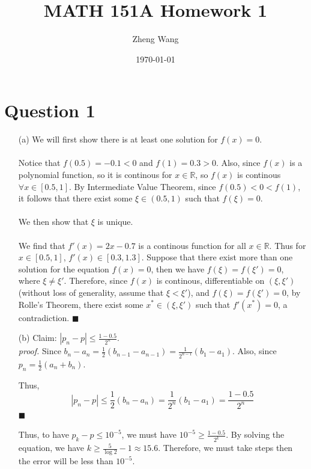 \documentclass[11pt]{article}
\author{Zheng Wang}
\date{\today}
\title{MATH 151A Homework 1}
\newcommand*{\boxtex}[1]{\framebox{#1}}
\begin{document}
\maketitle

\section*{Question 1}
\begin{itemize}
	\item[(a)]
	We will first show there is at least one solution for $ f(x)=0 $. \\\\
	 Notice that $ f(0.5) = -0.1 < 0 $ and $ f(1) = 0.3 > 0 $. Also, since $ f(x) $ is a polynomial function, so it is continous for $ x \in \mathbb{R} $, so $ f(x) $ is continous $ \forall x \in [0.5,1] $. By Intermediate Value Theorem, since $ f(0.5) < 0 < f(1) $, it follows that there exist some $ \xi \in  (0.5,1) $ such that $ f(\xi) = 0 $.\\\\
	We then show that $ \xi $ is unique.\\\\
	We find that $ f'(x) = 2x-0.7 $ is a continous function for all $ x \in \mathbb{R} $. Thus for $ x \in [0.5,1] $, $ f'(x) \in [0.3,1.3] $. Suppose that there exist more than one solution for the equation $ f(x)=0 $, then we have $ f(\xi)=f(\xi')=0 $, where $ \xi \ne \xi' $. Therefore, since $ f(x) $ is continous, differentiable on $ (\xi,\xi') $ (without loss of generality, assume that $ \xi < \xi' $), and $ f(\xi) = f(\xi')=0 $, by Rolle's Theorem, there exist some $ x^* \in (\xi, \xi') $ such that $ f'(x^*) = 0 $, a contradiction. \hfill$ \blacksquare $ 
	
	\item[(b)]
	Claim: $ \left| p_n- p \right| \le \frac{1-0.5}{2^n}  $.\\
	\textit{proof.} Since $ b_n - a_n = \frac{1}{2}(b_{n-1} - a_{n-1}) = \frac{1}{2^{n-1}}(b_1 - a_1) $. Also, since $ p_n = \frac{1}{2} (a_n+b_n) $.
	
	Thus, \[ \left| p_n - p \right| \le \frac{1}{2}\left(b_n-a_n \right) = \frac{1}{2^n}(b_1-a_1) = \frac{1-0.5}{2^n} \]
	\hfill$ \blacksquare $
	
	Thus, to have $ p_k - p \le 10^{-5} $, we must have $ 10^{-5} \ge \frac{1-0.5}{2^k} $. By solving the equation, we have $ k \ge \frac{5}{\log{2}} -1 \approx 15.6 $. Therefore, we must take \boxtex{$ k = 16 $} steps then the error will be less than $ 10^{-5} $. \pagebreak
	
	
\end{itemize}
\end{document}
